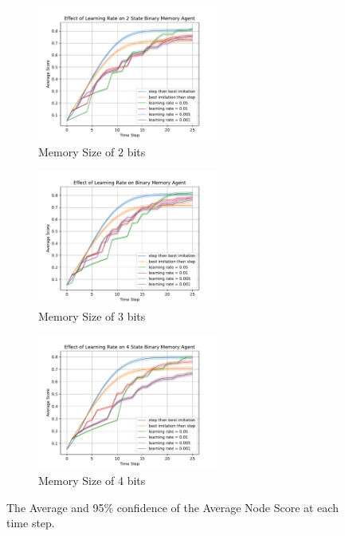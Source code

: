 \documentclass[a4paper]{article}
\begin{document}
\begin{figure}[ht]
    \centering
    \begin{subfigure}[b]{0.32\textwidth}
        \centering
        \includegraphics[width=16em]{../figures/comparison_b2.pdf}
        \caption{Memory Size of 2 bits}
        \label{comp_b2}
    \end{subfigure}
    \begin{subfigure}[b]{0.32\textwidth}
        \centering
        \includegraphics[width=16em]{../figures/comparison_b3.pdf}
        \caption{Memory Size of 3 bits}
        \label{comp_b3}
    \end{subfigure}
    \begin{subfigure}[b]{0.32\textwidth}
        \centering
        \includegraphics[width=16em]{../figures/comparison_b4.pdf}
        \caption{Memory Size of 4 bits}
        \label{comp_b4}
    \end{subfigure}
    \caption{
        The Average and 95\% confidence of the Average Node Score
        at each time step.
    }
    \label{comp}
\end{figure}
\end{document}
